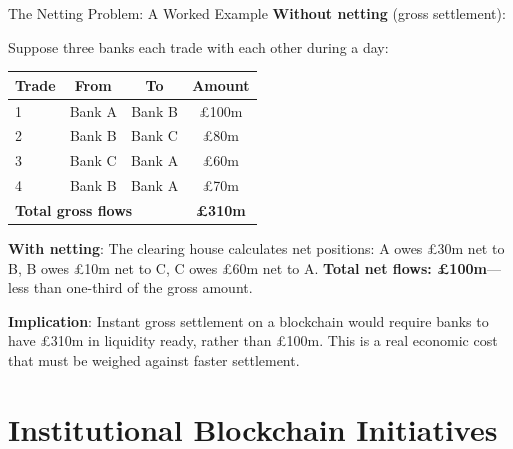 \documentclass[10pt]{beamer}
\begin{document}
\begin{frame}{The Netting Problem: A Worked Example}
  \textbf{Without netting} (gross settlement):
  
  \vspace{0.3em}
  Suppose three banks each trade with each other during a day:
  \begin{center}
    \small
    \begin{tabular}{lccc}
      \toprule
      \textbf{Trade} & \textbf{From} & \textbf{To} & \textbf{Amount} \\
      \midrule
      1 & Bank A & Bank B & \pounds 100m \\
      2 & Bank B & Bank C & \pounds 80m \\
      3 & Bank C & Bank A & \pounds 60m \\
      4 & Bank B & Bank A & \pounds 70m \\
      \midrule
      \multicolumn{3}{l}{\textbf{Total gross flows}} & \textbf{\pounds 310m} \\
      \bottomrule
    \end{tabular}
  \end{center}
  
  \vspace{0.5em}
  \textbf{With netting}: The clearing house calculates net positions: A owes \pounds 30m net to B, B owes \pounds 10m net to C, C owes \pounds 60m net to A. \textbf{Total net flows: \pounds 100m}---less than one-third of the gross amount.
  
  \vspace{0.5em}
  \textbf{Implication}: Instant gross settlement on a blockchain would require banks to have \pounds 310m in liquidity ready, rather than \pounds 100m. This is a real economic cost that must be weighed against faster settlement.
\end{frame}

\section{Institutional Blockchain Initiatives}
\end{document}
